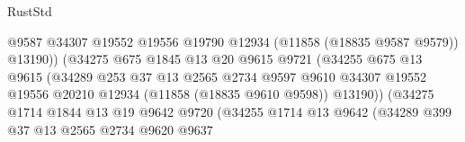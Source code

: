 \begin{lexlean}{RustStd}
\begin{coremodule}
                                          @9587
                                          @34307
                                          @19552
                                          @19556
                                          @19790
                                          @12934
                                          (@11858 (@18835 @9587 @9579))
                                          @13190))
                                      (@34275
                                        @675
                                        @1845
                                        @13
                                        @20
                                        @9615
                                        @9721
                                        (@34255
                                          @675
                                          @13
                                          @9615
                                          (@34289
                                            @253
                                            @37
                                            @13
                                            @2565
                                            @2734
                                            @9597
                                            @9610
                                            @34307
                                            @19552
                                            @19556
                                            @20210
                                            @12934
                                            (@11858 (@18835 @9610 @9598))
                                            @13190))
                                        (@34275
                                          @1714
                                          @1844
                                          @13
                                          @19
                                          @9642
                                          @9720
                                          (@34255
                                            @1714
                                            @13
                                            @9642
                                            (@34289
                                              @399
                                              @37
                                              @13
                                              @2565
                                              @2734
                                              @9620
                                              @9637

\end{coremodule}
\end{lexlean}
